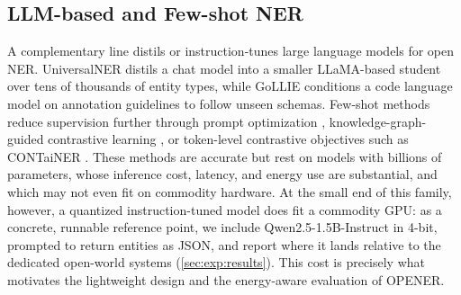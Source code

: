 \subsection{LLM-based and Few-shot NER}
\label{sec:related:llm}
A complementary line distils or instruction-tunes large language models for open NER.
UniversalNER \cite{zhou2024universalner} distils a chat model into a smaller LLaMA-based student \cite{touvron2023llama} over tens of thousands of entity types, while GoLLIE \cite{sainz2024gollie} conditions a code language model on annotation guidelines to follow unseen schemas.
Few-shot methods reduce supervision further through prompt optimization \cite{tang2024fsponer}, knowledge-graph-guided contrastive learning \cite{zhang2024kcl}, or token-level contrastive objectives such as CONTaiNER \cite{das2022container}.
These methods are accurate but rest on models with billions of parameters, whose inference cost, latency, and energy use are substantial, and which may not even fit on commodity hardware.
At the small end of this family, however, a quantized instruction-tuned model does fit a commodity GPU: as a concrete, runnable reference point, we include Qwen2.5-1.5B-Instruct \cite{qwen2025} in 4-bit, prompted to return entities as JSON, and report where it lands relative to the dedicated open-world systems (\autoref{sec:exp:results}).
This cost is precisely what motivates the lightweight design and the energy-aware evaluation of OPENER.

